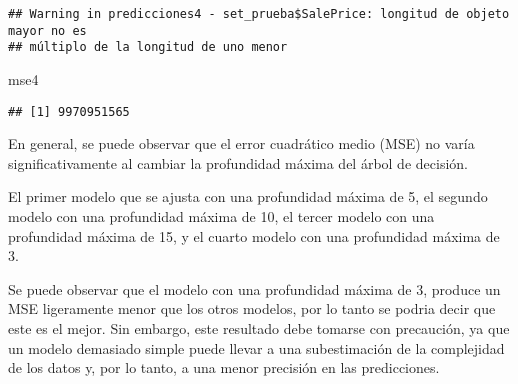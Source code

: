 \documentclass[
]{article}
\newenvironment{Shaded}{\begin{snugshade}}{\end{snugshade}}
\newcommand{\AttributeTok}[1]{\textcolor[rgb]{0.77,0.63,0.00}{#1}}
\newcommand{\DecValTok}[1]{\textcolor[rgb]{0.00,0.00,0.81}{#1}}
\newcommand{\FunctionTok}[1]{\textcolor[rgb]{0.00,0.00,0.00}{#1}}
\newcommand{\NormalTok}[1]{#1}
\newcommand{\OtherTok}[1]{\textcolor[rgb]{0.56,0.35,0.01}{#1}}
\newcommand{\SpecialCharTok}[1]{\textcolor[rgb]{0.00,0.00,0.00}{#1}}
\begin{document}
\begin{Shaded}
\end{Shaded}

\begin{verbatim}
## Warning in predicciones4 - set_prueba$SalePrice: longitud de objeto mayor no es
## múltiplo de la longitud de uno menor
\end{verbatim}

\begin{Shaded}
\begin{Highlighting}[]
\NormalTok{mse4}
\end{Highlighting}
\end{Shaded}

\begin{verbatim}
## [1] 9970951565
\end{verbatim}

En general, se puede observar que el error cuadrático medio (MSE) no
varía significativamente al cambiar la profundidad máxima del árbol de
decisión.

El primer modelo que se ajusta con una profundidad máxima de 5, el
segundo modelo con una profundidad máxima de 10, el tercer modelo con
una profundidad máxima de 15, y el cuarto modelo con una profundidad
máxima de 3.

Se puede observar que el modelo con una profundidad máxima de 3, produce
un MSE ligeramente menor que los otros modelos, por lo tanto se podria
decir que este es el mejor. Sin embargo, este resultado debe tomarse con
precaución, ya que un modelo demasiado simple puede llevar a una
subestimación de la complejidad de los datos y, por lo tanto, a una
menor precisión en las predicciones.
\end{document}
